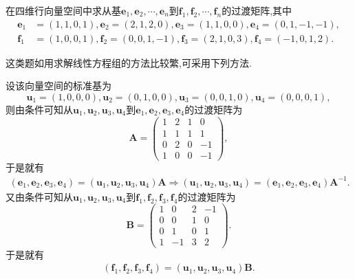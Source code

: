 \documentclass[../../main.tex]{subfiles}%
\begin{document}
\begin{example}
在四维行向量空间中求从基\(\boldsymbol{e}_1,\boldsymbol{e}_2,\cdots,\boldsymbol{e}_n\)到\(\boldsymbol{f}_1,\boldsymbol{f}_2,\cdots,\boldsymbol{f}_n\)的过渡矩阵,其中
\begin{align*}
\boldsymbol{e}_1&=(1,1,0,1),\boldsymbol{e}_2=(2,1,2,0),\boldsymbol{e}_3=(1,1,0,0),\boldsymbol{e}_4=(0,1,-1,-1),\\
\boldsymbol{f}_1&=(1,0,0,1),\boldsymbol{f}_2=(0,0,1,-1),\boldsymbol{f}_3=(2,1,0,3),\boldsymbol{f}_4=(-1,0,1,2).
\end{align*}
\end{example}
\begin{note}
这类题如用求解线性方程组的方法比较繁,可采用下列方法.
\end{note}
\begin{solution}
设该向量空间的标准基为
\[
\boldsymbol{u}_1=(1,0,0,0),\boldsymbol{u}_2=(0,1,0,0),\boldsymbol{u}_3=(0,0,1,0),\boldsymbol{u}_4=(0,0,0,1),
\]
则由条件可知从\(\boldsymbol{u}_1,\boldsymbol{u}_2,\boldsymbol{u}_3,\boldsymbol{u}_4\)到\(\boldsymbol{e}_1,\boldsymbol{e}_2,\boldsymbol{e}_3,\boldsymbol{e}_4\)的过渡矩阵为
\[
\boldsymbol{A}=\begin{pmatrix}
1&2&1&0\\
1&1&1&1\\
0&2&0&-1\\
1&0&0&-1
\end{pmatrix},
\]
于是就有
\begin{align}\label{equation:3.131.1}
\left( \boldsymbol{e}_1,\boldsymbol{e}_2,\boldsymbol{e}_3,\boldsymbol{e}_4 \right) =\left( \boldsymbol{u}_1,\boldsymbol{u}_2,\boldsymbol{u}_3,\boldsymbol{u}_4 \right) \boldsymbol{A}\Rightarrow \left( \boldsymbol{u}_1,\boldsymbol{u}_2,\boldsymbol{u}_3,\boldsymbol{u}_4 \right) =\left( \boldsymbol{e}_1,\boldsymbol{e}_2,\boldsymbol{e}_3,\boldsymbol{e}_4 \right) \boldsymbol{A}^{-1}.
\end{align}
又由条件可知从\(\boldsymbol{u}_1,\boldsymbol{u}_2,\boldsymbol{u}_3,\boldsymbol{u}_4\)到\(\boldsymbol{f}_1,\boldsymbol{f}_2,\boldsymbol{f}_3,\boldsymbol{f}_4\)的过渡矩阵为
\[
\boldsymbol{B}=\begin{pmatrix}
1&0&2&-1\\
0&0&1&0\\
0&1&0&1\\
1&-1&3&2
\end{pmatrix}.
\]
于是就有
\begin{align}\label{equation:3.131.2}
\left( \boldsymbol{f}_1,\boldsymbol{f}_2,\boldsymbol{f}_3,\boldsymbol{f}_4 \right) =\left( \boldsymbol{u}_1,\boldsymbol{u}_2,\boldsymbol{u}_3,\boldsymbol{u}_4 \right) \boldsymbol{B}.

\end{align}
\end{solution}
\end{document}
